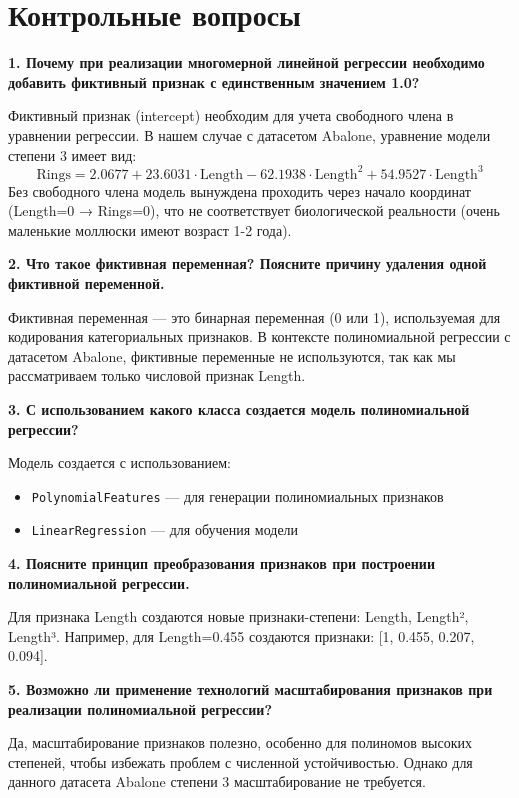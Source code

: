 \section{Контрольные вопросы}

\textbf{1. Почему при реализации многомерной линейной регрессии необходимо добавить фиктивный признак с единственным значением 1.0?}

Фиктивный признак (intercept) необходим для учета свободного члена в уравнении регрессии. В нашем случае с датасетом Abalone, уравнение модели степени 3 имеет вид:
\[
\text{Rings} = 2.0677 + 23.6031\cdot\text{Length} - 62.1938\cdot\text{Length}^2 + 54.9527\cdot\text{Length}^3
\]
Без свободного члена модель вынуждена проходить через начало координат (Length=0 → Rings=0), что не соответствует биологической реальности (очень маленькие моллюски имеют возраст 1-2 года).

\textbf{2. Что такое фиктивная переменная? Поясните причину удаления одной фиктивной переменной.}

Фиктивная переменная — это бинарная переменная (0 или 1), используемая для кодирования категориальных признаков. В контексте полиномиальной регрессии с датасетом Abalone, фиктивные переменные не используются, так как мы рассматриваем только числовой признак Length.

\textbf{3. С использованием какого класса создается модель полиномиальной регрессии?}

Модель создается с использованием:
\begin{itemize}
    \item \texttt{PolynomialFeatures} — для генерации полиномиальных признаков
    \item \texttt{LinearRegression} — для обучения модели
\end{itemize}

\textbf{4. Поясните принцип преобразования признаков при построении полиномиальной регрессии.}

Для признака Length создаются новые признаки-степени: Length, Length², Length³. Например, для Length=0.455 создаются признаки: [1, 0.455, 0.207, 0.094].

\textbf{5. Возможно ли применение технологий масштабирования признаков при реализации полиномиальной регрессии?}

Да, масштабирование признаков полезно, особенно для полиномов высоких степеней, чтобы избежать проблем с численной устойчивостью. Однако для данного датасета Abalone степени 3 масштабирование не требуется.

